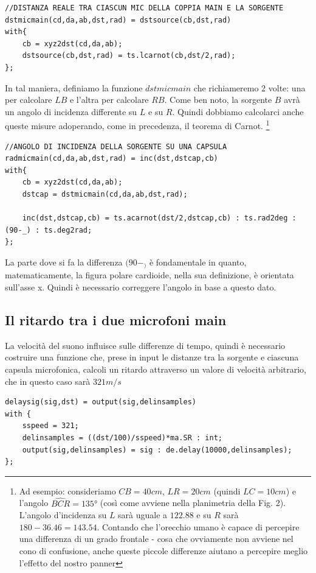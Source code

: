 \documentclass{article}
\begin{document}
    \begin{lstlisting}
//DISTANZA REALE TRA CIASCUN MIC DELLA COPPIA MAIN E LA SORGENTE
dstmicmain(cd,da,ab,dst,rad) = dstsource(cb,dst,rad)
with{
    cb = xyz2dst(cd,da,ab);
    dstsource(cb,dst,rad) = ts.lcarnot(cb,dst/2,rad);
};
    \end{lstlisting}
    
    In tal maniera, definiamo la funzione $dstmicmain$ che richiameremo 2 volte: una per calcolare $LB$ e l'altra per calcolare $RB$.
    Come ben noto, la sorgente $B$ avrà un angolo di incidenza differente su $L$ e su $R$. Quindi dobbiamo calcolarci anche queste misure adoperando, come in precedenza, il teorema di Carnot.
    \footnote{Ad esempio: consideriamo $CB = 40 cm$, $LR = 20cm$ (quindi $LC=10cm$) e l'angolo $\widehat{BCR} = 135°$ (così come avviene nella planimetria della Fig. 2). L'angolo d'incidenza su $L$ sarà uguale a $122.88$ e su $R$ sarà $180-36.46=143.54$. Contando che l'orecchio umano è capace di percepire una differenza di un grado frontale - cosa che ovviamente non avviene nel cono di confusione, anche queste piccole differenze aiutano a percepire meglio l'effetto del nostro panner}
    
    \begin{lstlisting}
//ANGOLO DI INCIDENZA DELLA SORGENTE SU UNA CAPSULA
radmicmain(cd,da,ab,dst,rad) = inc(dst,dstcap,cb)
with{
    cb = xyz2dst(cd,da,ab);
    dstcap = dstmicmain(cd,da,ab,dst,rad);
    
    inc(dst,dstcap,cb) = ts.acarnot(dst/2,dstcap,cb) : ts.rad2deg : (90-_) : ts.deg2rad;
};
    \end{lstlisting}

    La parte dove si fa la differenza $(90-_)$ è fondamentale in quanto, matematicamente, la figura polare cardioide, nella sua definizione, è orientata sull'asse x. Quindi è necessario correggere l'angolo in base a questo dato.\\
\subsection{Il ritardo tra i due microfoni main}
    La velocità del suono influisce sulle differenze di tempo, quindi è necessario costruire una funzione che, prese in input le distanze tra la sorgente e ciascuna capsula microfonica, calcoli un ritardo attraverso un valore di velocità arbitrario, che in questo caso sarà $321 m/s$

    \begin{lstlisting}
delaysig(sig,dst) = output(sig,delinsamples)
with {
    sspeed = 321;
    delinsamples = ((dst/100)/sspeed)*ma.SR : int;
    output(sig,delinsamples) = sig : de.delay(10000,delinsamples);
};
    \end{lstlisting}
    
\end{document}
